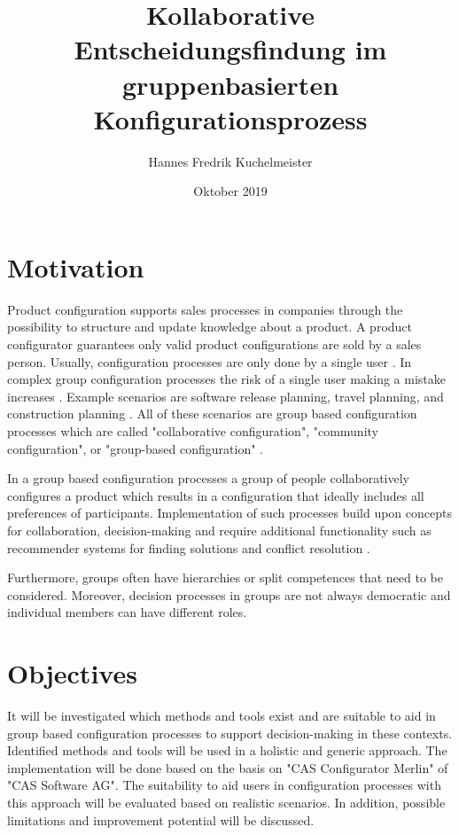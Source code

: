 \documentclass{article}
\title{Kollaborative Entscheidungsfindung im gruppenbasierten Konfigurationsprozess}
\author{Hannes Fredrik Kuchelmeister}
\date{Oktober 2019}
\begin{document}
\maketitle

\section{Motivation}

Product configuration supports sales processes in companies through the possibility to structure and update knowledge about a product. A product configurator guarantees only valid product configurations are sold by a sales person. Usually, configuration processes are only done by a single user \cite{felferningGroupBasedConfiguration2016, velasquez-guevaraMultiSPLOTSupportingMultiuser2018a}.
In complex group configuration processes the risk of a single user making a mistake increases \cite{felfernigGroupDecisionSupport2011}.
Example scenarios are software release planning, travel planning, and construction planning \cite{felfernigOpenConfiguration2014}. All of these scenarios are group based configuration processes which are called "collaborative configuration", "community configuration", or "group-based configuration" \cite{felferningGroupBasedConfiguration2016, felfernigOpenConfiguration2014,mendoncaCollaborativeProductConfiguration2008,felfernigKnowledgebasedConfigurationResearch2014}.

In a group based configuration processes a group of people collaboratively configures a product which results in a configuration that ideally includes all preferences of participants. Implementation of such processes build upon concepts for collaboration, decision-making and require additional functionality such as recommender systems for finding solutions and conflict resolution \cite{felfernigKnowledgebasedConfigurationResearch2014}.


Furthermore, groups often have hierarchies or split competences that need to be considered. Moreover, decision processes in groups are not always democratic and individual members can have different roles.

\section{Objectives}

It will be investigated which methods and tools exist and are suitable to aid in group based configuration processes to support decision-making in these contexts. Identified methods and tools will be used in a holistic and generic approach. The implementation will be done based on the basis on "CAS Configurator Merlin" of "CAS Software AG". The suitability to aid users in configuration processes with this approach will be evaluated based on realistic scenarios. In addition, possible limitations and improvement potential will be discussed.
\end{document}
